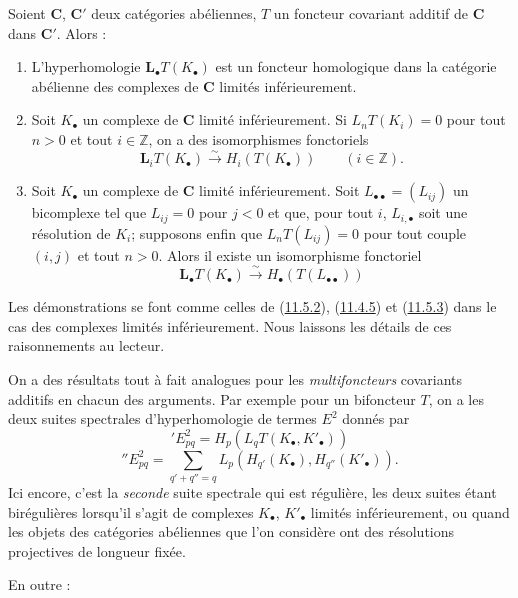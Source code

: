 \begin{proposition}[11.6.3]
\label{0.11.6.3-fr}
Soient $\boldsymbol{C}$, $\boldsymbol{C}'$ deux catégories abéliennes, $T$ un foncteur
covariant additif de $\boldsymbol{C}$ dans $\boldsymbol{C}'$. Alors :
\begin{enumerate}
\item[{\rm(i)}] {L'hyperhomologie $\mathbf{L}_\bullet T(K_\bullet)$ est un
foncteur homologique dans la catégorie abélienne des complexes de
$\boldsymbol{C}$ limités inférieurement.}
\item[{\rm(ii)}] {Soit $K_\bullet$ un complexe de $\boldsymbol{C}$ limité
inférieurement. Si $L_nT(K_i)=0$ pour tout $n>0$ et tout $i\in\mathbb Z$, on
a des isomorphismes fonctoriels}
\[
\label{0.11.6.3.1-fr}
\tag{11.6.3.1}
\mathbf{L}_iT(K_\bullet)\xrightarrow{\sim} H_i(T(K_\bullet))\qquad(i\in\mathbb Z).
\]
\item[{\rm(iii)}] {Soit $K_\bullet$ un complexe de $\boldsymbol{C}$ limité
inférieurement. Soit $L_{\bullet\bullet}=(L_{ij})$ un bicomplexe tel que
$L_{ij}=0$ pour $j<0$ et que, pour tout $i$, $L_{i,\bullet}$ soit une
résolution de $K_i$; supposons enfin que $L_nT(L_{ij})=0$ pour tout couple
$(i,j)$ et tout $n>0$. Alors il existe un isomorphisme fonctoriel}
\[
\label{0.11.6.3.2-fr}
\tag{11.6.3.2}
\mathbf{L}_\bullet T(K_\bullet)\xrightarrow{\sim} H_\bullet(T(L_{\bullet\bullet}))
\]
\end{enumerate}
\upshape Les démonstrations se font comme celles de
(\hyperref[0.11.5.2-fr]{11.5.2}), (\hyperref[0.11.4.5-fr]{11.4.5}) et
(\hyperref[0.11.5.3-fr]{11.5.3}) dans le cas des complexes limités
inférieurement. Nous laissons les détails de ces raisonnements au lecteur.
\end{proposition}

\begin{env}[11.6.4]
\label{0.11.6.4-fr}
On a des résultats tout à fait analogues pour les \emph{multifoncteurs} covariants
additifs en chacun des arguments. Par exemple pour un bifoncteur $T$, on a
les deux suites spectrales d'hyperhomologie de termes $E^2$ donnés par
\[
\label{0.11.6.4.1-fr}
\tag{11.6.4.1}
{}'E^2_{pq}=H_p(L_qT(K_\bullet,K'_\bullet))
\]
\[
\label{0.11.6.4.2-fr}
\tag{11.6.4.2}
{}''E^2_{pq}=
\sum_{q'+q''=q}L_p(H_{q'}(K_\bullet),H_{q''}(K'_\bullet)).
\]
Ici encore, c'est la \emph{seconde} suite spectrale qui est régulière, les deux
suites étant birégulières lorsqu'il s'agit de complexes $K_\bullet$,
$K'_\bullet$ limités inférieurement, ou quand les objets des catégories
abéliennes que l'on considère ont des résolutions projectives de longueur
fixée.

En outre :
\end{env}

